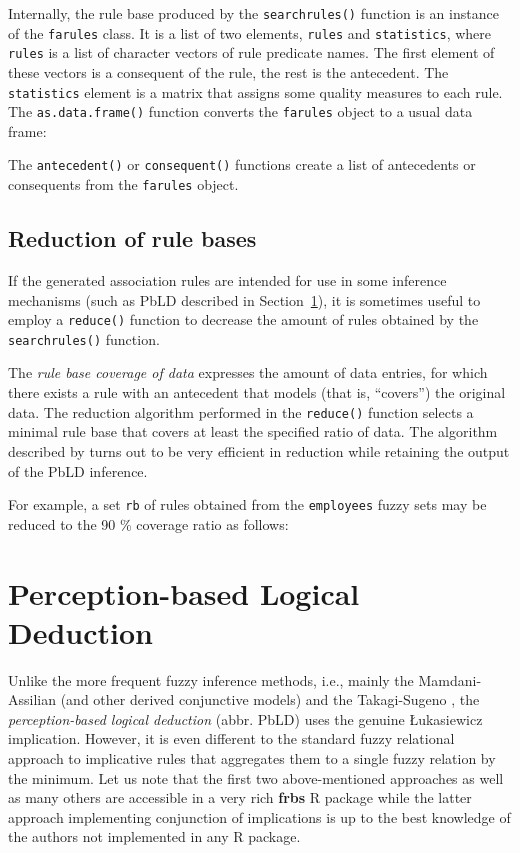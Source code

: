 \documentclass[review]{elsarticle}
\newcommand{\pkg}[1]{\textbf{#1}}
\newcommand{\proglang}[1]{#1}
\newcommand{\code}[1]{\texttt{#1}}
\begin{document}
Internally, the rule base produced by the \code{searchrules()} function is an instance of the \code{farules} class. It is a list of two elements, \code{rules} and \code{statistics}, where \code{rules} is a list of character vectors of rule predicate names. The first element of these vectors is a consequent of the rule, the rest is the antecedent. The \code{statistics} element is a matrix that assigns some quality measures to each rule. The \code{as.data.frame()} function converts the \code{farules} object to a usual data frame:
%

%
The \code{antecedent()} or \code{consequent()} functions create a list of antecedents or consequents from the \code{farules} object.
%
%


\subsection{Reduction of rule bases}

If the generated association rules are intended for use in some inference mechanisms (such as PbLD described in Section~\ref{sec:pbld}), it is sometimes useful to employ a \code{reduce()} function to decrease the amount of rules obtained by the \code{searchrules()} function.

The \emph{rule base coverage of data} expresses the amount of data entries, for which there exists a
rule with an antecedent that models (that is, ``covers'') the original data. The reduction algorithm performed in the \code{reduce()} function selects a minimal rule base that covers at least the specified ratio of data. The algorithm described by \cite{burda2015} turns out to be very efficient in reduction while retaining the output of the PbLD inference.

For example, a set \code{rb} of rules obtained from the \code{employees} fuzzy sets may be reduced to the 90 \% coverage ratio as follows:
%





\section{Perception-based Logical Deduction}
\label{sec:pbld}


Unlike the more frequent fuzzy inference methods, i.e., mainly the Mamdani-Assilian \citep{MamdaniAssilian75} (and other derived conjunctive models) and the Takagi-Sugeno \citep{TakagiSugeno:IEEE85}, the \emph{ perception-based logical deduction} (abbr. PbLD) uses the genuine \L ukasiewicz implication. However, it is even different to the standard fuzzy relational approach to implicative rules \citep{BodenhoferDankovaStepnickaNovak07} that aggregates them to a single fuzzy relation by the minimum. Let us note that the first two above-mentioned approaches as well as many others are accessible in a very rich \pkg{frbs} \proglang{R} package while the latter approach implementing conjunction of implications is up to the best knowledge of the authors not implemented in any \proglang{R} package. 
\end{document}
